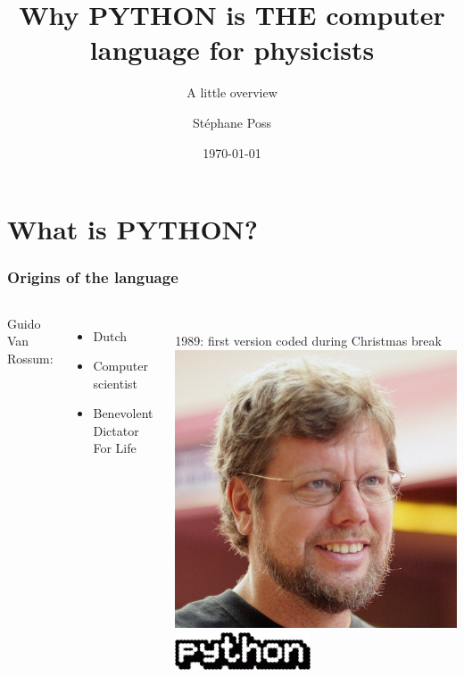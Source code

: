 \documentclass[14pt]{beamer}
\title{Why PYTHON is THE computer language for physicists}
\subtitle{A little overview}
\author{St\'ephane Poss}
\date{\today}
\begin{document}
\begin{frame}[plain]
\titlepage
\end{frame}

\begin{frame}
\tableofcontents
\end{frame}

\section{What is PYTHON?}

\begin{frame}
\frametitle{Origins of the language}
\begin{columns}
Guido Van Rossum:
\begin{itemize}
\item Dutch
\item Computer scientist
\item Benevolent Dictator For Life
\end{itemize}
~\\
1989: first version coded during Christmas break
\includegraphics[width=\textwidth]{guido.jpg}\\
\includegraphics[width=4cm]{PythonProgLogo.png}
\end{columns}
\end{frame}
\end{document}
